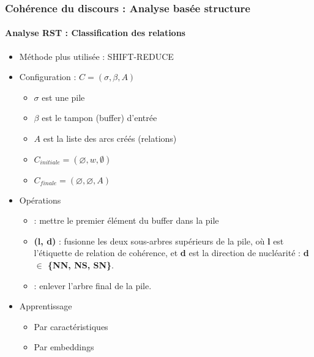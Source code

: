 \documentclass[xcolor=table]{beamer}
\begin{document}
\begin{frame}
	\frametitle{Cohérence du discours : Analyse basée structure}
	\framesubtitle{Analyse RST : Classification des relations}
	
	\begin{minipage}{.6\textwidth}
	\begin{itemize}
		\item Méthode plus utilisée : SHIFT-REDUCE
		\item Configuration : $C = (\sigma, \beta, A)$
		\begin{itemize}
			\item $\sigma$ est une pile
			\item $\beta$ est le tampon (buffer) d'entrée
			\item $A$ est la liste des arcs créés (relations)
			\item $C_{initiale} = (\varnothing, w, \emptyset)$
			\item $C_{finale} = (\varnothing, \varnothing, A)$
		\end{itemize}
	\end{itemize}
	\end{minipage}
	\begin{minipage}{.38\textwidth}
	\end{minipage}
	\begin{itemize}
		\item Opérations 
		\begin{itemize}
			\item {} : mettre le premier élément du buffer dans la pile
			\item {}\textbf{(l, d)} : fusionne les deux sous-arbres supérieurs de la pile, où \textbf{l} est l'étiquette de relation de cohérence, et \textbf{d} est la direction de nucléarité : \textbf{d $ \in $ \{NN, NS, SN\}}.
			\item {} : enlever l'arbre final de la pile.
		\end{itemize}
		\item Apprentissage 
		\begin{itemize}
			\item Par caractéristiques
			\item Par embeddings
		\end{itemize}
	\end{itemize}
	
\end{frame}
\end{document}
